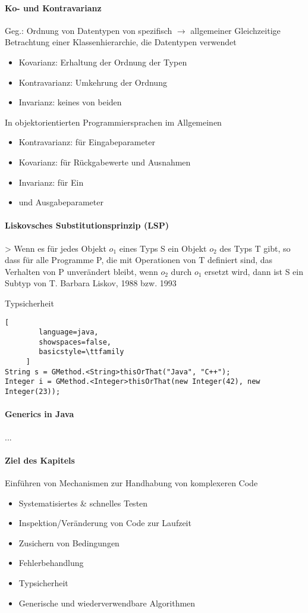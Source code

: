 \documentclass[10pt]{article}
\begin{document}
\paragraph{Ko- und Kontravarianz}
Geg.: Ordnung von Datentypen von spezifisch $\rightarrow$ allgemeiner
Gleichzeitige Betrachtung einer Klassenhierarchie, die Datentypen verwendet
\begin{itemize}
  \item Kovarianz: Erhaltung der Ordnung der Typen
  \item Kontravarianz: Umkehrung der Ordnung
  \item Invarianz: keines von beiden
\end{itemize}
In objektorientierten Programmiersprachen im Allgemeinen
\begin{itemize}
  \item Kontravarianz: für Eingabeparameter
  \item Kovarianz: für Rückgabewerte und Ausnahmen
  \item Invarianz: für Ein\item und Ausgabeparameter
\end{itemize}

\paragraph{Liskovsches Substitutionsprinzip (LSP)}
> Wenn es für jedes Objekt $o_1$ eines Typs S ein Objekt $o_2$ des Typs T gibt, so dass für alle Programme P, die mit Operationen von T definiert sind, das Verhalten von P unverändert bleibt, wenn $o_2$ durch $o_1$ ersetzt wird, dann ist S ein Subtyp von T.
Barbara Liskov, 1988 bzw. 1993

Typsicherheit
\begin{lstlisting}[
        language=java,
        showspaces=false,
        basicstyle=\ttfamily
     ]
String s = GMethod.<String>thisOrThat("Java", "C++");
Integer i = GMethod.<Integer>thisOrThat(new Integer(42), new Integer(23));
\end{lstlisting}

\paragraph{Generics in Java}
...

\paragraph{Ziel des Kapitels}
Einführen von Mechanismen zur Handhabung von komplexeren Code
\begin{itemize}
  \item Systematisiertes \& schnelles Testen
  \item Inspektion/Veränderung von Code zur Laufzeit
  \item Zusichern von Bedingungen
  \item Fehlerbehandlung
  \item Typsicherheit
  \item Generische und wiederverwendbare Algorithmen
\end{itemize}
\end{document}
